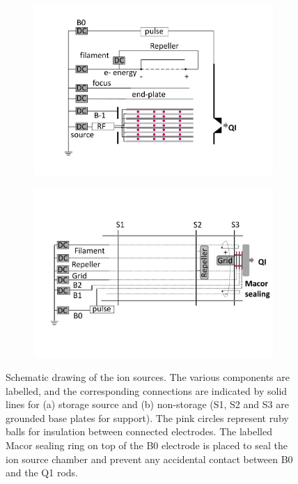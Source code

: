 \begin{figure}[!htb]
    \centering
    \begin{subfigure}[b]{0.49\textwidth}
        \centering
        \includegraphics[width=1\textwidth]{figures/Instruments/ion-source/storage.pdf}
        \caption{}
        \label{fig:setup:storage-ion-source}
    \end{subfigure}
    \hfill
    \begin{subfigure}[b]{0.49\textwidth}
        \centering
        \includegraphics[width=1\textwidth]{figures/Instruments/ion-source/non-storage.pdf}
        \caption{}
        \label{fig:setup:non-storage-ion-source}
    \end{subfigure}
    \hfill
    \caption{Schematic drawing of the ion sources. The various components are labelled, and the corresponding connections are indicated by solid lines for (a) storage source and (b) non-storage (S1, S2 and S3 are grounded base plates for support). The pink circles represent ruby balls for insulation between connected electrodes. The labelled Macor sealing ring on top of the B0 electrode is placed to seal the ion source chamber and prevent any accidental contact between B0 and the Q1 rods.}
    \label{fig:setup:ion-source}
\end{figure}

